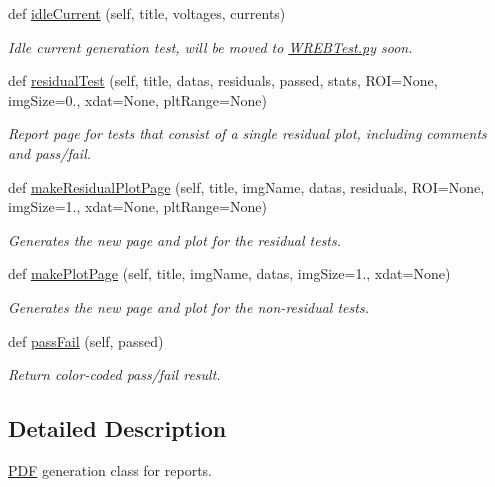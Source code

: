 \begin{DoxyCompactItemize}
def \hyperlink{class_w_r_e_b_test_p_d_f_gen_1_1_p_d_f_a9399adfb4fedf634d835d8243e6b16ef}{idle\+Current} (self, title, voltages, currents)
\begin{DoxyCompactList}\small\item\em Idle current generation test, will be moved to \hyperlink{_w_r_e_b_test_8py}{W\+R\+E\+B\+Test.\+py} soon. \end{DoxyCompactList}\item 
def \hyperlink{class_w_r_e_b_test_p_d_f_gen_1_1_p_d_f_aee5ef1bfcfb93cc18bf1942e68396568}{residual\+Test} (self, title, datas, residuals, passed, stats, R\+OI=None, img\+Size=0., xdat=None, plt\+Range=None)
\begin{DoxyCompactList}\small\item\em Report page for tests that consist of a single residual plot, including comments and pass/fail. \end{DoxyCompactList}\item 
def \hyperlink{class_w_r_e_b_test_p_d_f_gen_1_1_p_d_f_ad8bdb2be88e67b4f538d7749a340e175}{make\+Residual\+Plot\+Page} (self, title, img\+Name, datas, residuals, R\+OI=None, img\+Size=1., xdat=None, plt\+Range=None)
\begin{DoxyCompactList}\small\item\em Generates the new page and plot for the residual tests. \end{DoxyCompactList}\item 
def \hyperlink{class_w_r_e_b_test_p_d_f_gen_1_1_p_d_f_ac11d25d68eb296a39f765b94a591f514}{make\+Plot\+Page} (self, title, img\+Name, datas, img\+Size=1., xdat=None)
\begin{DoxyCompactList}\small\item\em Generates the new page and plot for the non-\/residual tests. \end{DoxyCompactList}\item 
def \hyperlink{class_w_r_e_b_test_p_d_f_gen_1_1_p_d_f_a9447fe59159ad061109cf27ad87618f6}{pass\+Fail} (self, passed)
\begin{DoxyCompactList}\small\item\em Return color-\/coded pass/fail result. \end{DoxyCompactList}\end{DoxyCompactItemize}


\subsection{Detailed Description}
\hyperlink{class_w_r_e_b_test_p_d_f_gen_1_1_p_d_f}{P\+DF} generation class for reports. 

